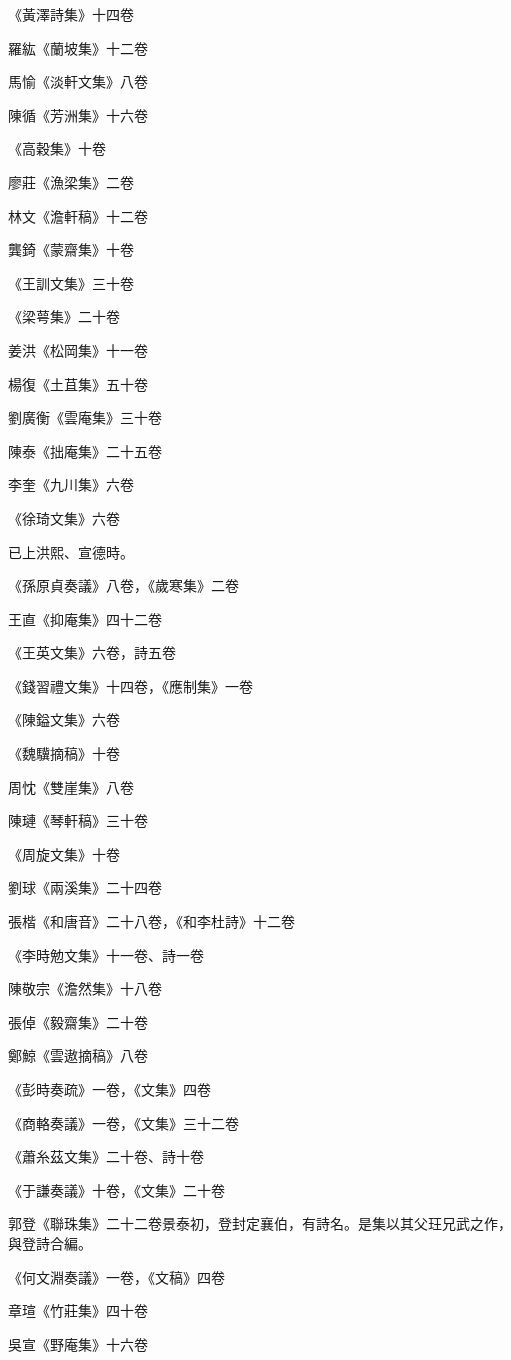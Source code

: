 《黃澤詩集》十四卷

羅紘《蘭坡集》十二卷

馬愉《淡軒文集》八卷

陳循《芳洲集》十六卷

《高穀集》十卷

廖莊《漁梁集》二卷

林文《澹軒稿》十二卷

龔錡《蒙齋集》十卷

《王訓文集》三十卷

《梁萼集》二十卷

姜洪《松岡集》十一卷

楊復《土苴集》五十卷

劉廣衡《雲庵集》三十卷

陳泰《拙庵集》二十五卷

李奎《九川集》六卷

《徐琦文集》六卷

已上洪熙、宣德時。

《孫原貞奏議》八卷，《歲寒集》二卷

王直《抑庵集》四十二卷

《王英文集》六卷，詩五卷

《錢習禮文集》十四卷，《應制集》一卷

《陳鎰文集》六卷

《魏驥摘稿》十卷

周忱《雙崖集》八卷

陳璉《琴軒稿》三十卷

《周旋文集》十卷

劉球《兩溪集》二十四卷

張楷《和唐音》二十八卷，《和李杜詩》十二卷

《李時勉文集》十一卷、詩一卷

陳敬宗《澹然集》十八卷

張倬《毅齋集》二十卷

鄭鯨《雲遨摘稿》八卷

《彭時奏疏》一卷，《文集》四卷

《商輅奏議》一卷，《文集》三十二卷

《蕭糸茲文集》二十卷、詩十卷

《于謙奏議》十卷，《文集》二十卷

郭登《聯珠集》二十二卷景泰初，登封定襄伯，有詩名。是集以其父玨兄武之作，與登詩合編。

《何文淵奏議》一卷，《文稿》四卷

章瑄《竹莊集》四十卷

吳宣《野庵集》十六卷

